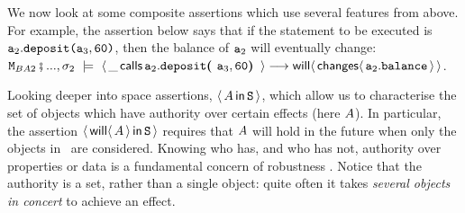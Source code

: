 %
%
%
%

 We now look at some composite assertions which use  
 several features from above. For example, the assertion below 
says that if the statement to be executed is   ${{\mbox{\tt{a}}}}_2.{\mbox{\tt{deposit}}}{\mbox{\tt{(}}}{{\mbox{\tt{a}}}}_3,{\mbox{\tt{60}}}{\mbox{\tt{)}}}$,
then the balance of ${{\mbox{\tt{a}}}}_2$ will eventually change:\\

\vspace*{-1mm}
\noindent $\M_{BA2}\mkpair ...,\sigma_2 \ \models \ {\Calls {\_}   {\prg{deposit}} {\acc_2} {\acc_3,\prg{60}} } \longrightarrow {\Future{ \Changes {\acc_2.\bal}}}$.

\vspace{.2cm}
 
Looking deeper into space assertions, $\langle\, A\, \mathsf{in}\, {{\mbox{\tt{S}}}}\, \rangle$, which
allow us to characterise the set of objects which have authority over
certain effects (here $A$). In particular,  the assertion   $\langle\, {\mathsf{will}}\langle \,A\,\rangle\, \mathsf{in}\, {{\mbox{\tt{S}}}}\, \rangle$  requires that $A$ will hold in
the future when only the objects in \SF\ are considered.
Knowing who has, and who has not, authority over properties or data is a fundamental concern of robustness
\cite{MillerPhD}. Notice that the authority is a set, rather than a single object: quite often it takes \emph{several objects in concert}
 to achieve an effect.


